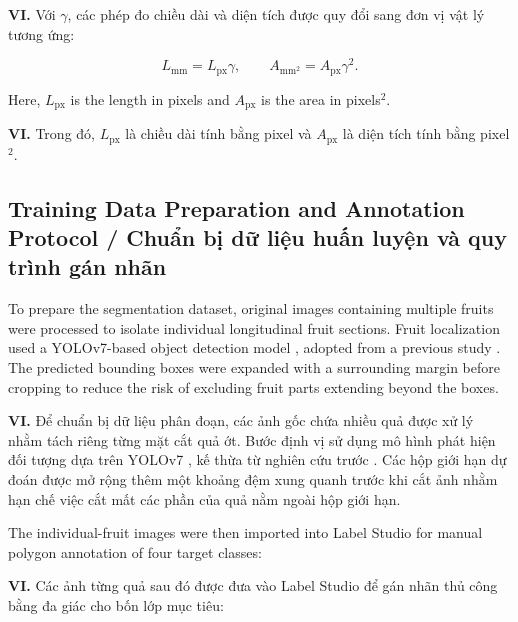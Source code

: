\documentclass[final,1p,11pt,longtitle]{elsarticle}
\newenvironment{viet}{\par\smallskip\begingroup\color{viColor}\noindent\textbf{VI. }\ignorespaces}{\par\endgroup\smallskip}
\begin{document}
\begin{viet}
Với $\gamma$, các phép đo chiều dài và diện tích được quy đổi sang đơn vị vật lý tương ứng:
\end{viet}

\begin{equation}
 L_{\mathrm{mm}} = L_{\mathrm{px}} \gamma,\qquad
 A_{\mathrm{mm}^2} = A_{\mathrm{px}} \gamma^{2}.
\end{equation}




\noindent Here, $L_{\mathrm{px}}$ is the length in pixels and $A_{\mathrm{px}}$ is the area in pixels$^2$.

\begin{viet}
Trong đó, $L_{\mathrm{px}}$ là chiều dài tính bằng pixel và $A_{\mathrm{px}}$ là diện tích tính bằng pixel$^2$.
\end{viet}



\subsection*{Training Data Preparation and Annotation Protocol / {\color{viColor} Chuẩn bị dữ liệu huấn luyện và quy trình gán nhãn}}
To prepare the segmentation dataset, original images containing multiple fruits were processed to isolate individual longitudinal fruit sections. Fruit localization used a YOLOv7-based object detection model \cite{yolov7}, adopted from a previous study \cite{ver1}. The predicted bounding boxes were expanded with a surrounding margin before cropping to reduce the risk of excluding fruit parts extending beyond the boxes.

\begin{viet}
Để chuẩn bị dữ liệu phân đoạn, các ảnh gốc chứa nhiều quả được xử lý nhằm tách riêng từng mặt cắt quả ớt. Bước định vị sử dụng mô hình phát hiện đối tượng dựa trên YOLOv7 \cite{yolov7}, kế thừa từ nghiên cứu trước \cite{ver1}. Các hộp giới hạn dự đoán được mở rộng thêm một khoảng đệm xung quanh trước khi cắt ảnh nhằm hạn chế việc cắt mất các phần của quả nằm ngoài hộp giới hạn.
\end{viet}


The individual-fruit images were then imported into Label Studio for manual polygon annotation of four target classes:

\begin{viet}
Các ảnh từng quả sau đó được đưa vào Label Studio để gán nhãn thủ công bằng đa giác cho bốn lớp mục tiêu:
\end{viet}
\end{document}
